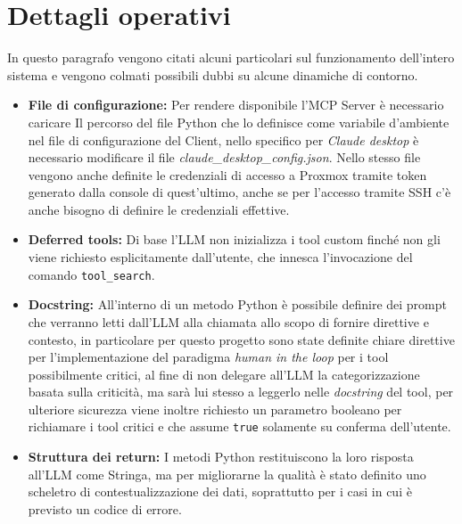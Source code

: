 \section{Dettagli operativi}
In questo paragrafo vengono citati alcuni particolari sul funzionamento dell'intero sistema e vengono colmati possibili dubbi su alcune dinamiche di contorno.
\begin{itemize}
    \item \textbf{File di configurazione:} Per rendere disponibile l'MCP Server è necessario caricare Il percorso del file Python che lo definisce come variabile d'ambiente nel file di configurazione del Client, nello specifico per \textit{Claude desktop} è necessario modificare il file \textit{claude\_desktop\_config.json}. Nello stesso file vengono anche definite le credenziali di accesso a Proxmox tramite token generato dalla console di quest'ultimo, anche se per l'accesso tramite SSH c'è anche bisogno di definire le credenziali effettive.
    \item \textbf{Deferred tools:} Di base l'LLM non inizializza i tool custom finché non gli viene richiesto esplicitamente  dall'utente, che innesca l'invocazione del comando \texttt{tool\_search}.
    \item \textbf{Docstring:} All'interno di un metodo Python è possibile definire dei prompt che verranno letti dall'LLM alla chiamata allo scopo di fornire direttive e contesto, in particolare per questo progetto sono state definite chiare direttive per l'implementazione del paradigma \textit{human in the loop} per i tool possibilmente critici, al fine di non delegare all'LLM la categorizzazione basata sulla criticità, ma sarà lui stesso a leggerlo nelle \textit{docstring} del tool, per ulteriore sicurezza viene inoltre richiesto un parametro booleano per richiamare i tool critici e che assume \texttt{true} solamente su conferma dell'utente.
    \item \textbf{Struttura dei return:} I metodi Python restituiscono la loro risposta all'LLM come Stringa, ma per migliorarne la qualità è stato definito uno scheletro di contestualizzazione dei dati, soprattutto per i casi in cui è previsto un codice di errore.
\end{itemize}

